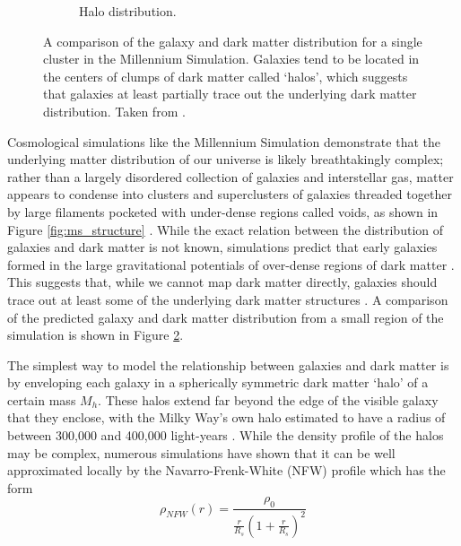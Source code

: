 \documentclass[%
 reprint,
 amsmath,amssymb,
 aps,nofootinbib
]{revtex4-1}
\begin{document}
\begin{figure}
\begin{subfigure}[H]{0.375\textwidth}
        \caption{Halo distribution.}
        \label{ms_halos}
    \end{subfigure}
    \captionsetup{justification=raggedright,singlelinecheck=false}
    \caption{A comparison of the galaxy and dark matter distribution for a single cluster in the Millennium Simulation. Galaxies tend to be located in the centers of clumps of dark matter called `halos', which suggests that galaxies at least partially trace out the underlying dark matter distribution. Taken from \cite{ms_figures}.}
    \label{ms_compare}
\end{figure}


Cosmological simulations like the Millennium Simulation demonstrate that the underlying matter distribution of our universe is likely breathtakingly complex; rather than a largely disordered collection of galaxies and interstellar gas, matter appears to condense into clusters and superclusters of galaxies threaded together by large filaments pocketed with under-dense regions called voids, as shown in Figure \ref{fig:ms_structure} \cite{ms_figures}. While the exact relation between the distribution of galaxies and dark matter is not known, simulations predict that early galaxies formed in the large gravitational potentials of over-dense regions of dark matter \cite{halo_formation}. This suggests that, while we cannot map dark matter directly, galaxies should trace out at least some of the underlying dark matter structures \cite{abundance_matching}. A comparison of the predicted galaxy and dark matter distribution from a small region of the simulation is shown in Figure \ref{ms_compare}.

The simplest way to model the relationship between galaxies and dark matter is by enveloping each galaxy in a spherically symmetric dark matter `halo' of a certain mass $M_h$. These halos extend far beyond the edge of the visible galaxy that they enclose, with the Milky Way's own halo estimated to have a radius of between 300,000 and 400,000 light-years \cite{milky_way_halo}. While the density profile of the halos may be complex, numerous simulations have shown that it can be well approximated locally by the Navarro-Frenk-White (NFW) profile which has the form
\begin{equation}\label{nfw_profile}
\rho_{NFW}(r)=\frac{\rho_0}{\frac{r}{R_s}\left(1+\frac{r}{R_s}\right)^2}
\end{equation}
\end{document}
